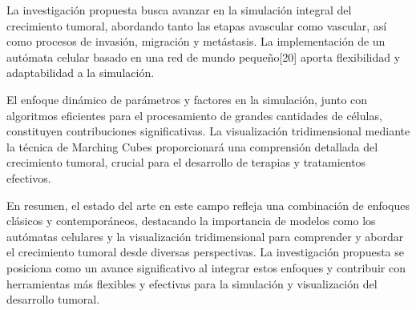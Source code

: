 La investigación propuesta busca avanzar en la simulación integral del crecimiento tumoral, abordando tanto las etapas avascular como vascular, así como procesos de invasión, migración y metástasis. La implementación de un autómata celular basado en una red de mundo pequeño[20] aporta flexibilidad y adaptabilidad a la simulación.

El enfoque dinámico de parámetros y factores en la simulación, junto con algoritmos eficientes para el procesamiento de grandes cantidades de células, constituyen contribuciones significativas. La visualización tridimensional mediante la técnica de Marching Cubes proporcionará una comprensión detallada del crecimiento tumoral, crucial para el desarrollo de terapias y tratamientos efectivos.

En resumen, el estado del arte en este campo refleja una combinación de enfoques clásicos y contemporáneos, destacando la importancia de modelos como los autómatas celulares y la visualización tridimensional para comprender y abordar el crecimiento tumoral desde diversas perspectivas. La investigación propuesta se posiciona como un avance significativo al integrar estos enfoques y contribuir con herramientas más flexibles y efectivas para la simulación y visualización del desarrollo tumoral.